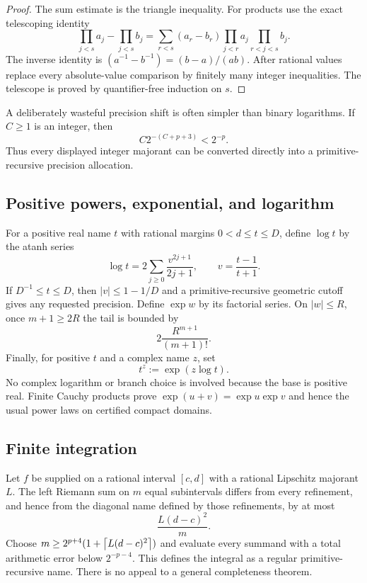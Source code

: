 \begin{proof}
The sum estimate is the triangle inequality.  For products use the exact telescoping identity
\[
 \prod_{j<s}a_j-\prod_{j<s}b_j
 =\sum_{r<s}(a_r-b_r)\prod_{j<r}a_j\prod_{r<j<s}b_j.
\]
The inverse identity is $(a^{-1}-b^{-1})=(b-a)/(ab)$.  After rational values replace every absolute-value comparison by finitely many integer inequalities.  The telescope is proved by quantifier-free induction on $s$.
\end{proof}

A deliberately wasteful precision shift is often simpler than binary logarithms.  If $C\ge1$ is an integer, then
\[
 C2^{-(C+p+3)}<2^{-p}.
\]
Thus every displayed integer majorant can be converted directly into a primitive-recursive precision allocation.

\subsection{Positive powers, exponential, and logarithm}

For a positive real name $t$ with rational margins $0<d\le t\le D$, define $\log t$ by the atanh series
\[
 \log t=2\sum_{j\ge0}\frac{v^{2j+1}}{2j+1},\qquad v=\frac{t-1}{t+1}.
\]
If $D^{-1}\le t\le D$, then $|v|\le1-1/D$ and a primitive-recursive geometric cutoff gives any requested precision.  Define $\exp w$ by its factorial series.  On $|w|\le R$, once $m+1\ge2R$ the tail is bounded by
\[
 2\frac{R^{m+1}}{(m+1)!}.
\]
Finally, for positive $t$ and a complex name $z$, set
\[
 t^z:=\exp(z\log t).
\]
No complex logarithm or branch choice is involved because the base is positive real.  Finite Cauchy products prove $\exp(u+v)=\exp u\exp v$ and hence the usual power laws on certified compact domains.

\subsection{Finite integration}

Let $f$ be supplied on a rational interval $[c,d]$ with a rational Lipschitz majorant $L$.  The left Riemann sum on $m$ equal subintervals differs from every refinement, and hence from the diagonal name defined by those refinements, by at most
\[
 \frac{L(d-c)^2}{m}.
\]
Choose $m\ge 2^{p+4}(1+\left\lceil L(d-c)^2\right\rceil)$ and evaluate every summand with a total arithmetic error below $2^{-p-4}$.  This defines the integral as a regular primitive-recursive name.  There is no appeal to a general completeness theorem.

